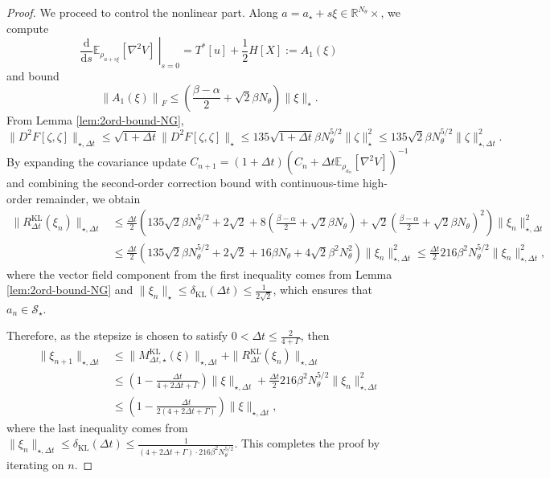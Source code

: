 \documentclass[11pt]{article}
\theoremstyle{plain}
\theoremstyle{definition}
\theoremstyle{remark}
\newcommand{\R}{\mathbb{R}}
\newcommand{\E}{\mathbb{E}}
\newcommand{\KL}{\mathrm{KL}}
\newcommand{\dd}{\mathrm{d}}
\begin{document}
\begin{proof}
    We proceed to control the nonlinear part. Along $a = a_\star + s\xi \in \R^{N_\theta} \times $, we compute
    \begin{equation*}
        \left. \frac{\dd}{\dd s} \E_{\rho_{a + s \xi}}[\nabla^2 V] \ \right|_{s=0} = T^*[u] + \frac{1}{2} H[X] := A_1 (\xi)
    \end{equation*}
    and bound \begin{equation*}
        \left\| A_1 (\xi) \right\|_F \leq \left( \frac{\beta - \alpha}{2} + \sqrt{2} \beta N_\theta \right) \|\xi\|_\star.
    \end{equation*}
    From Lemma \ref{lem:2ord-bound-NG}, 
    \begin{equation*}
        \| D^2 F[\zeta, \zeta]\|_{\star, \Delta t} \leq \sqrt{1 + \Delta t} \| D^2 F[\zeta, \zeta]\|_{\star} \leq 135 \sqrt{1 + \Delta t} \beta N_\theta^{5/2} \|\zeta\|_{\star}^2 \leq 135\sqrt{2} \beta N_\theta^{5/2} \|\zeta\|_{\star, \Delta t}^2.
    \end{equation*}
    By expanding the covariance update $C_{n+1} = (1 + \Delta t) (C_n + \Delta t \E_{\rho_{a_n}}[\nabla^2 V])^{-1}$ and combining the second-order correction bound with continuous-time high-order remainder, we obtain
    \begin{align*}
        \|R_{\Delta t}^\KL (\xi_n) \|_{\star, \Delta t} &\leq \frac{\Delta t}{2} \left( 135 \sqrt{2} \beta N_\theta^{5/2} + 2\sqrt{2} + 8\left( \frac{\beta - \alpha}{2} + \sqrt{2} \beta N_\theta \right) + \sqrt{2} \left( \frac{\beta - \alpha}{2} + \sqrt{2} \beta N_\theta \right)^2 \right) \|\xi_n\|_{\star, \Delta t}^2 \\
        &\leq \frac{\Delta t}{2} \left( 135 \sqrt{2} \beta N_\theta^{5/2} + 2\sqrt{2} + 16 \beta N_\theta + 4\sqrt{2} \beta^2 N_\theta^2 \right) \|\xi_n\|_{\star, \Delta t}^2 \leq \frac{\Delta t}{2} 216 \beta^2 N_\theta^{5/2} \|\xi_n\|_{\star, \Delta t}^2,
    \end{align*}
    where the vector field component from the first inequality comes from Lemma \ref{lem:2ord-bound-NG} and $\|\xi_n\|_\star \leq \delta_\KL (\Delta t) \leq \frac{1}{2\sqrt{2}}$, which ensures that $a_n \in \mathcal{S}_\star$.

    Therefore, as the stepsize is chosen to satisfy $0 < \Delta t \leq \frac{2}{4 + \Gamma}$, then
    \begin{align*}
        \|\xi_{n+1} \|_{\star, \Delta t} &\leq \|M_{\Delta t, \star}^\KL (\xi)\|_{\star, \Delta t} + \|R_{\Delta t}^\KL (\xi_n) \|_{\star, \Delta t} \\
        &\leq \left( 1 - \frac{\Delta t}{4 + 2\Delta t + \Gamma} \right) \|\xi\|_{\star, \Delta t} + \frac{\Delta t}{2} 216 \beta^2 N_\theta^{5/2} \|\xi_n\|_{\star, \Delta t}^2 \\
        &\leq \left( 1 - \frac{\Delta t}{2(4 + 2\Delta t + \Gamma)} \right) \|\xi\|_{\star, \Delta t},
    \end{align*}
    where the last inequality comes from $\|\xi_n\|_{\star, \Delta t} \leq \delta_\KL (\Delta t) \leq \frac{1}{(4 + 2 \Delta t + \Gamma) \cdot 216 \beta^2 N_\theta^{5/2}}$. This completes the proof by iterating on $n$.
\end{proof}
\end{document}
